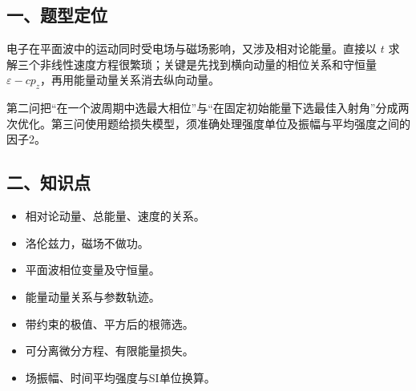 \documentclass[12pt,a4paper,fontset=fandol]{ctexart}
\providecommand{\tightlist}{\setlength{\itemsep}{0pt}\setlength{\parskip}{0pt}}
\begin{document}
\begin{center}
\begin{minipage}{\linewidth}
\centering\begingroup
{}
\ifdim\wd\diagrambox>.88\linewidth
\sbox{\diagrambox}{\resizebox{.88\linewidth}{!}{\usebox{\diagrambox}}}
\fi
\ifdim\ht\diagrambox>.40\textheight
\resizebox{!}{.40\textheight}{\usebox{\diagrambox}}
\else\usebox{\diagrambox}\fi
\par{}
\endgroup\end{minipage}
\end{center}

\subsection{一、题型定位}\label{ux4e00ux9898ux578bux5b9aux4f4d-3}

电子在平面波中的运动同时受电场与磁场影响，又涉及相对论能量。直接以 \(t\)
求解三个非线性速度方程很繁琐；关键是先找到横向动量的相位关系和守恒量
\(\varepsilon-cp_z\)，再用能量动量关系消去纵向动量。

第二问把``在一个波周期中选最大相位''与``在固定初始能量下选最佳入射角''分成两次优化。第三问使用题给损失模型，须准确处理强度单位及振幅与平均强度之间的因子2。

\subsection{二、知识点}\label{ux4e8cux77e5ux8bc6ux70b9-3}

\begin{itemize}
\tightlist
\item
  相对论动量、总能量、速度的关系。
\item
  洛伦兹力，磁场不做功。
\item
  平面波相位变量及守恒量。
\item
  能量动量关系与参数轨迹。
\item
  带约束的极值、平方后的根筛选。
\item
  可分离微分方程、有限能量损失。
\item
  场振幅、时间平均强度与SI单位换算。
\end{itemize}
\end{document}
